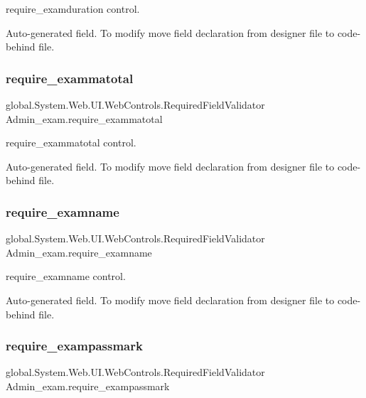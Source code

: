 require\+\_\+examduration control. 

Auto-\/generated field. To modify move field declaration from designer file to code-\/behind file. \mbox{\label{class_admin__exam_add940b5e9f11fc9a0647def68070ec69}} 
\subsubsection{\texorpdfstring{require\_exammatotal}{require\_exammatotal}}
{\footnotesize\ttfamily global.\+System.\+Web.\+U\+I.\+Web\+Controls.\+Required\+Field\+Validator Admin\+\_\+exam.\+require\+\_\+exammatotal\hspace{0.3cm}{\ttfamily [protected]}}



require\+\_\+exammatotal control. 

Auto-\/generated field. To modify move field declaration from designer file to code-\/behind file. \mbox{\label{class_admin__exam_a8b0e6a4826f0059248af77c18984ed8d}} 
\subsubsection{\texorpdfstring{require\_examname}{require\_examname}}
{\footnotesize\ttfamily global.\+System.\+Web.\+U\+I.\+Web\+Controls.\+Required\+Field\+Validator Admin\+\_\+exam.\+require\+\_\+examname\hspace{0.3cm}{\ttfamily [protected]}}



require\+\_\+examname control. 

Auto-\/generated field. To modify move field declaration from designer file to code-\/behind file. \mbox{\label{class_admin__exam_ac1e52aa784d879c0a293f0693011e8be}} 
\subsubsection{\texorpdfstring{require\_exampassmark}{require\_exampassmark}}
{\footnotesize\ttfamily global.\+System.\+Web.\+U\+I.\+Web\+Controls.\+Required\+Field\+Validator Admin\+\_\+exam.\+require\+\_\+exampassmark\hspace{0.3cm}{\ttfamily [protected]}}



